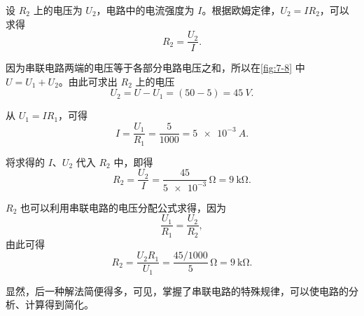 \medskip
\begin{solution}
  设 $R_2$ 上的电压为 $U_2$，电路中的电流强度为 $I$。根据欧姆定律，$U_2=IR_2$，可以求得
    \[R_2=\frac{U_2}{I}.\]

因为串联电路两端的电压等于各部分电路电压之和，所以在\cref{fig:7-8} 中 $U=U_1+U_2$。由此可求出 $R_2$ 上的电压
\[U_2=U-U_1=(50-5)=\qty{45}{V}.\]

从 $U_1=IR_1$，可得
\[ I=\frac{U_1}{R_1}=\frac{5}{1000}=\qty{5e-3}{A}.\]

将求得的 $I$、$U_2$ 代入 $R_2$ 中，即得
\[R_2=\frac{U_2}{I}=\frac{45}{\num{5e-3}}\,\unit{\ohm}=\qty{9}{\kilo\ohm}.\]

$R_2$ 也可以利用串联电路的电压分配公式求得，因为
\[\frac{U_1}{R_1}=\frac{U_2}{R_2},\]
由此可得
\[R_2=\frac{U_2R_1}{U_1}=\frac{45/1000}{5}\,\unit{\ohm}=\qty{9}{\kilo\ohm}.\]
\end{solution}

显然，后一种解法简便得多，可见，掌握了串联电路的特殊规律，可以使电路的分析、计算得到简化。

